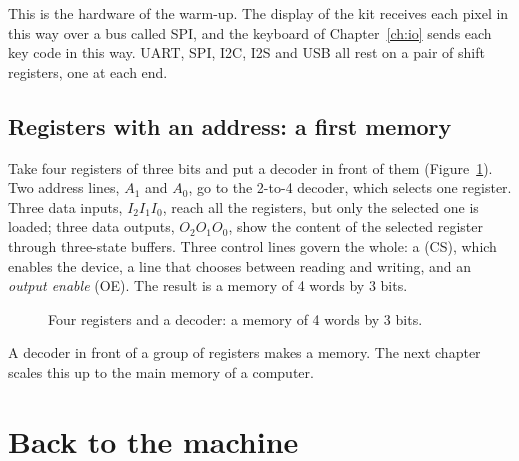 This is the hardware of the warm-up. The display of the kit receives each
pixel in this way over a bus called SPI, and the keyboard of
Chapter~\ref{ch:io} sends each key code in this way. UART, SPI, I2C, I2S and
USB all rest on a pair of shift registers, one at each end.

\subsection{Registers with an address: a first memory}

Take four registers of three bits and put a decoder in front of them
(Figure~\ref{fig:rb:mem}). Two address lines, $A_1$ and $A_0$, go to the
2-to-4 decoder, which selects one register. Three data inputs, $I_2I_1I_0$,
reach all the registers, but only the selected one is loaded; three data
outputs, $O_2O_1O_0$, show the content of the selected register through
three-state buffers. Three control lines govern the whole: a  (CS), which enables the device, a line that chooses between reading
and writing, and an \emph{output enable} (OE). The result is a memory of 4
words by 3 bits.

\begin{figure}[htb]
\centering
{}
\caption{Four registers and a decoder: a memory of 4 words by 3 bits.}
\label{fig:rb:mem}
\end{figure}

\begin{prgconcept}
A decoder in front of a group of registers makes a memory. The next chapter
scales this up to the main memory of a computer.
\end{prgconcept}

\section{Back to the machine}

